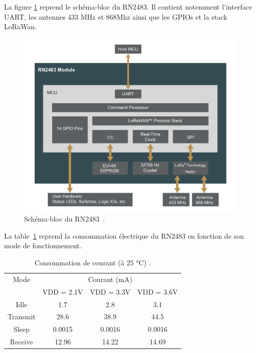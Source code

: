     La figure \ref{fig:state-rn2484-block} reprend le schéma-bloc du RN2483. Il contient notemment l'interface UART, les antennes 433 MHz et 868Mhz ainsi que les GPIOs et la stack LoRaWan.
    \begin{figure}[H]
        \centering
        \includegraphics[scale=0.4]{res/rn2483-block-diagram.png}
        \caption{Schéma-bloc du RN2483~\cite{rn2483:datasheet}.}
        \label{fig:state-rn2484-block}
    \end{figure}
    La table~\ref{tb:state-rn2483-consumption} reprend la consommation électrique du RN2483 en fonction de son mode de fonctionnement.
    \begin{table}[H]
        \centering
        \begin{tabular}{| *{4}{c|} }
            \hline
            Mode & \multicolumn{3}{c|}{\multirow{1}{*}{Courant (mA)}}\\ \cline{2-4}
             & VDD = 2.1V & VDD = 3.3V  & VDD = 3.6V \\ \hhline{|=|=|=|=|}
            Idle & 1.7 & 2.8 & 3.1 \\ \hline
            Transmit & 28.6 & 38.9 & 44.5 \\ \hline
            Sleep & 0.0015 & 0.0016 & 0.0016 \\ \hline
            Receive & 12.96 & 14.22 & 14.69 \\ \hline
        \end{tabular}
        \caption{Consommation de courant (à 25 °C) \cite{rn2483:datasheet}.}
        \label{tb:state-rn2483-consumption}
    \end{table}

